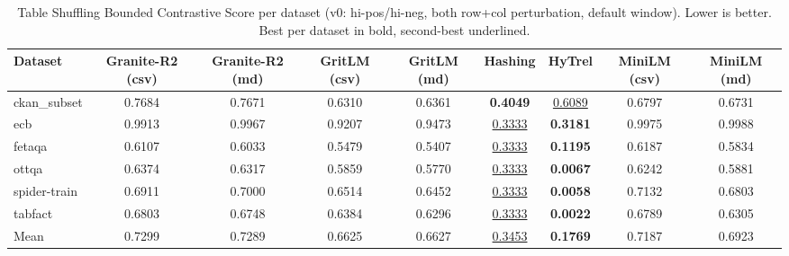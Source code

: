 \begin{table}[t]
\centering
\begin{tabular*}{\textwidth}{lcccccccc}
\hline
Dataset & Granite-R2 (csv) & Granite-R2 (md) & GritLM (csv) & GritLM (md) & Hashing & HyTrel & MiniLM (csv) & MiniLM (md) \\
\hline
ckan\_subset & 0.7684 & 0.7671 & 0.6310 & 0.6361 & \textbf{0.4049} & \underline{0.6089} & 0.6797 & 0.6731 \\
ecb & 0.9913 & 0.9967 & 0.9207 & 0.9473 & \underline{0.3333} & \textbf{0.3181} & 0.9975 & 0.9988 \\
fetaqa & 0.6107 & 0.6033 & 0.5479 & 0.5407 & \underline{0.3333} & \textbf{0.1195} & 0.6187 & 0.5834 \\
ottqa & 0.6374 & 0.6317 & 0.5859 & 0.5770 & \underline{0.3333} & \textbf{0.0067} & 0.6242 & 0.5881 \\
spider-train & 0.6911 & 0.7000 & 0.6514 & 0.6452 & \underline{0.3333} & \textbf{0.0058} & 0.7132 & 0.6803 \\
tabfact & 0.6803 & 0.6748 & 0.6384 & 0.6296 & \underline{0.3333} & \textbf{0.0022} & 0.6789 & 0.6305 \\
\hline
Mean & 0.7299 & 0.7289 & 0.6625 & 0.6627 & \underline{0.3453} & \textbf{0.1769} & 0.7187 & 0.6923 \\
\hline
\end{tabular*}
\caption{Table Shuffling Bounded Contrastive Score per dataset (v0: hi-pos/hi-neg, both row+col perturbation, default window). Lower is better. Best per dataset in bold, second-best underlined.}
\label{tab:shuffling_bcs}
\end{table}

